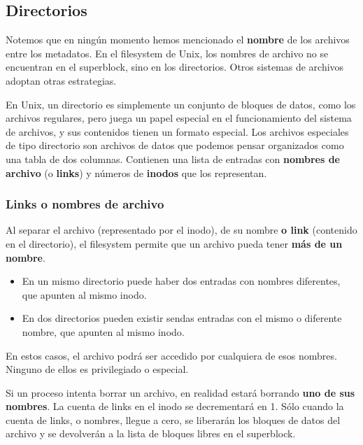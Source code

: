 \documentclass[spanish,a4paper,]{article}
\providecommand{\tightlist}{%
  \setlength{\itemsep}{0pt}\setlength{\parskip}{0pt}}
\begin{document}
\hypertarget{directorios-1}{%
\subsection{Directorios}\label{directorios-1}}

Notemos que en ningún momento hemos mencionado el \textbf{nombre} de los
archivos entre los metadatos. En el filesystem de Unix, los nombres de
archivo no se encuentran en el superblock, sino en los directorios.
Otros sistemas de archivos adoptan otras estrategias.

En Unix, un directorio es simplemente un conjunto de bloques de datos,
como los archivos regulares, pero juega un papel especial en el
funcionamiento del sistema de archivos, y sus contenidos tienen un
formato especial. Los archivos especiales de tipo directorio son
archivos de datos que podemos pensar organizados como una tabla de dos
columnas. Contienen una lista de entradas con \textbf{nombres de
archivo} (o \textbf{links}) y números de \textbf{inodos} que los
representan.

\hypertarget{links-o-nombres-de-archivo}{%
\subsubsection{Links o nombres de
archivo}\label{links-o-nombres-de-archivo}}

Al separar el archivo (representado por el inodo), de su nombre
\textbf{o link} (contenido en el directorio), el filesystem permite que
un archivo pueda tener \textbf{más de un nombre}.

\begin{itemize}
\tightlist
\item
  En un mismo directorio puede haber dos entradas con nombres
  diferentes, que apunten al mismo inodo.
\item
  En dos directorios pueden existir sendas entradas con el mismo o
  diferente nombre, que apunten al mismo inodo.
\end{itemize}

En estos casos, el archivo podrá ser accedido por cualquiera de esos
nombres. Ninguno de ellos es privilegiado o especial.

Si un proceso intenta borrar un archivo, en realidad estará borrando
\textbf{uno de sus nombres}. La cuenta de links en el inodo se
decrementará en 1. Sólo cuando la cuenta de links, o nombres, llegue a
cero, se liberarán los bloques de datos del archivo y se devolverán a la
lista de bloques libres en el superblock.
\end{document}
